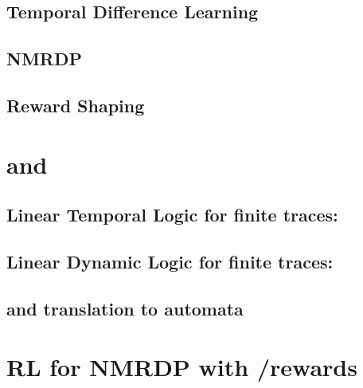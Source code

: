 \subsection{Temporal Difference Learning}
\subsection{NMRDP}
\label{NMRDP}
\subsection{Reward Shaping}
\section{\LTLf and \LDLf}
\subsection{Linear Temporal Logic for finite traces: \LTLf}
\subsection{Linear Dynamic Logic for finite traces: \LDLf}
\subsection{\LTLf and \LDLf translation to automata}
\section{RL for NMRDP with \LTLf/\LDLf rewards}
